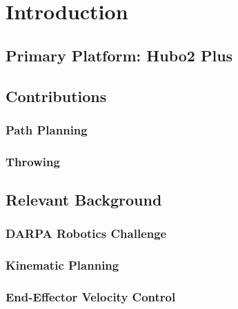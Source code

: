\section{Introduction}
	
	\subsection{Primary Platform: Hubo2 Plus}\label{sec:hubo}
			
	\subsection{Contributions}\label{sec:contributions}
		
		\subsubsection{Path Planning}\label{sec:srm}
		
		

		\subsubsection{Throwing}\label{sec:baseball}
		
		
		
%		
		
	\subsection{Relevant Background}\label{sec:background}
    		
    	\subsubsection{DARPA Robotics Challenge}\label{sec:drc}
    	    
		\subsubsection{Kinematic Planning}
			
		\subsubsection{End-Effector Velocity Control}
			
%			
